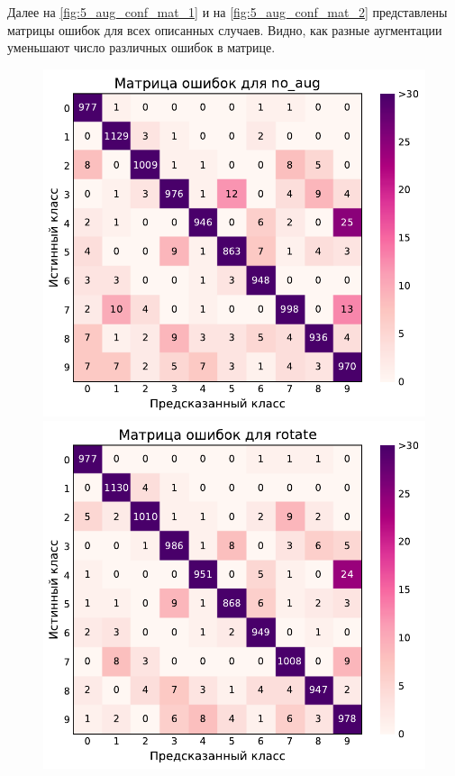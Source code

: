 \documentclass[12pt]{article}
\begin{document}
Далее на \autoref{fig:5_aug_conf_mat_1} и на \autoref{fig:5_aug_conf_mat_2} представлены матрицы ошибок для всех описанных случаев. Видно, как разные аугментации уменьшают число различных ошибок в матрице.
\begin{figure}[!h]
    \includegraphics[scale=0.6]{5_aug_conf_mat_no_aug.pdf}
    \includegraphics[scale=0.6]{5_aug_conf_mat_rotate.pdf}

\end{figure}
\end{document}
